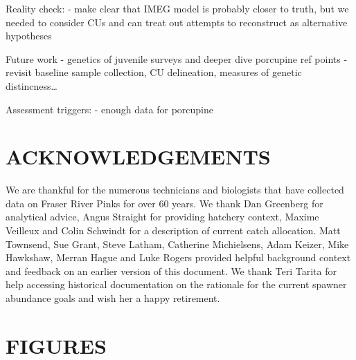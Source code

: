 \documentclass[11pt]{book}
\begin{document}
Reality check: - make clear that IMEG model is probably closer to truth, but we needed to consider CUs and can treat out attempts to reconstruct as alternative hypotheses

Future work - genetics of juvenile surveys and deeper dive porcupine ref points - revisit baseline sample collection, CU delineation, measures of genetic distincness\ldots{}

Assessment triggers: - enough data for porcupine

\hypertarget{acknowledgements}{%
\section{ACKNOWLEDGEMENTS}\label{acknowledgements}}

We are thankful for the numerous technicians and biologists that have collected data on Fraser River Pinks for over 60 years. We thank Dan Greenberg for analytical advice, Angus Straight for providing hatchery context, Maxime Veilleux and Colin Schwindt for a description of current catch allocation. Matt Townsend, Sue Grant, Steve Latham, Catherine Michielsens, Adam Keizer, Mike Hawkshaw, Merran Hague and Luke Rogers provided helpful background context and feedback on an earlier version of this document. We thank Teri Tarita for help accessing historical documentation on the rationale for the current spawner abundance goals and wish her a happy retirement.

\hypertarget{figures}{%
\section{FIGURES}\label{figures}}
\end{document}
